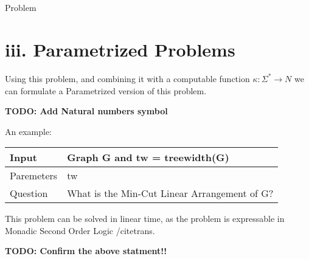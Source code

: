 \section*{}

Problem
\section*{iii. Parametrized Problems}

Using this problem, and combining it with a computable function $ \kappa : \Sigma^* \rightarrow N $ we can formulate a Parametrized version of this problem. 

\textbf{TODO: Add Natural numbers symbol}

An example:

\begin{center}
    \begin{tabular}{| l | p{5cm} |}
    \hline
    Input & Graph G and tw = treewidth(G)\\ \hline
    Paremeters & tw  \\ \hline
    Question & What is the Min-Cut Linear Arrangement of G?\\ \hline
    \end{tabular}
\end{center}

This problem can be solved in linear time, as the problem is expressable in Monadic Second Order Logic /cite{trans}.

\textbf{TODO: Confirm the above statment!!}
